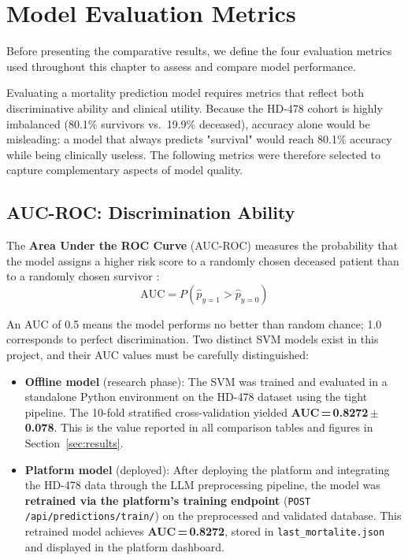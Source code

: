 \documentclass[12pt,a4paper,twoside]{report}
\begin{document}
\section{Model Evaluation Metrics}\label{sec:metrics}

Before presenting the comparative results, we define the four evaluation metrics used throughout this chapter to assess and compare model performance.

Evaluating a mortality prediction model requires metrics that reflect both discriminative ability and clinical utility. Because the HD-478 cohort is highly imbalanced (80.1\% survivors vs.\ 19.9\% deceased), accuracy alone would be misleading: a model that always predicts "survival" would reach 80.1\% accuracy while being clinically useless. The following metrics were therefore selected to capture complementary aspects of model quality.

\subsection{AUC-ROC: Discrimination Ability}

The \textbf{Area Under the ROC Curve} (AUC-ROC) measures the probability that the model assigns a higher risk score to a randomly chosen deceased patient than to a randomly chosen survivor \cite{hanley1982auc}:
\begin{equation}
\text{AUC} = P(\hat{p}_{y=1} > \hat{p}_{y=0})
\label{eq:auc}
\end{equation}

An AUC of 0.5 means the model performs no better than random chance; 1.0 corresponds to perfect discrimination. Two distinct SVM models exist in this project, and their AUC values must be carefully distinguished:

\begin{itemize}
  \item \textbf{Offline model} (research phase): The SVM was trained and evaluated in a standalone Python environment on the HD-478 dataset using the tight pipeline. The 10-fold stratified cross-validation yielded \textbf{AUC\,=\,0.8272\,$\pm$\,0.078}. This is the value reported in all comparison tables and figures in Section~\ref{sec:results}.

  \item \textbf{Platform model} (deployed): After deploying the platform and integrating the HD-478 data through the LLM preprocessing pipeline, the model was \textbf{retrained via the platform's training endpoint} (\texttt{POST /api/predictions/train/}) on the preprocessed and validated database. This retrained model achieves \textbf{AUC\,=\,0.8272}, stored in \texttt{last\_mortalite.json} and displayed in the platform dashboard.
\end{itemize}
\end{document}
